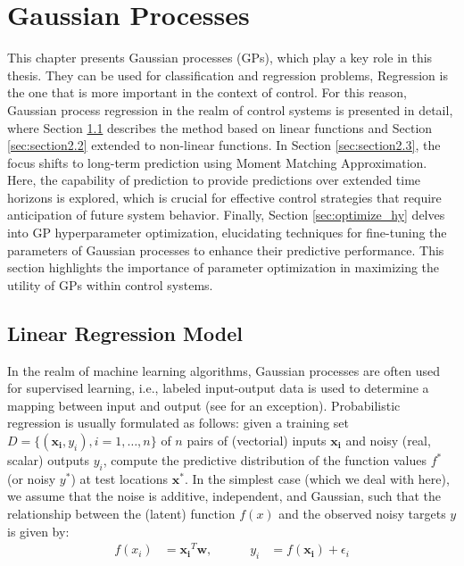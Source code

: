 \section{ Gaussian Processes}	\label{sec: GP-2}

This chapter presents Gaussian processes (GPs), which play a key role in this thesis. They can be used for classification and regression problems, Regression is the one that is more important in the context of control. For this reason, Gaussian process regression in the realm of control systems is presented in detail, where Section \ref{sec:section2.1} describes the method based on linear functions and Section \ref{sec:section2.2} extended to non-linear functions. In Section \ref{sec:section2.3}, the focus shifts to long-term prediction using Moment Matching Approximation. Here, the capability of prediction to provide predictions over extended time horizons is explored, which is crucial for effective control strategies that require anticipation of future system behavior. Finally, Section \ref{sec:optimize_hy} delves into GP hyperparameter optimization, elucidating techniques for fine-tuning the parameters of Gaussian processes to enhance their predictive performance. This section highlights the importance of parameter optimization in maximizing the utility of GPs within control systems.

\subsection{Linear Regression Model}\label{sec:section2.1}
In the realm of machine learning algorithms, Gaussian processes are often used for supervised learning, i.e., labeled input-output data is used to determine a mapping between input and output (see \cite{lawrence2005} for an exception). Probabilistic regression is usually formulated as follows: given a training set $D = \{(\mathbf{x_i}, y_i), i = 1, \ldots, n\}$ of $n$ pairs of (vectorial) inputs $\mathbf{x_i}$ and noisy (real, scalar) outputs $y_i$, compute the predictive distribution of the function values $f^*$ (or noisy $y^*$) at test locations $\mathbf{x^*}$. In the simplest case (which we deal with here), we assume that the noise is additive, independent, and Gaussian, such that the relationship between the (latent) function $f(x)$ and the observed noisy targets $y$ is given by:
\begin{equation}\label{eq:latent_function}
\begin{aligned}
    f(x_i) &= \mathbf{x_i}^T \mathbf{w}, \, \, \,\, \, \,\,\, \,\,\,\,\,\,\,\,\, \, y_i &= f(\mathbf{x_i}) + \epsilon_i
\end{aligned}
\end{equation}

